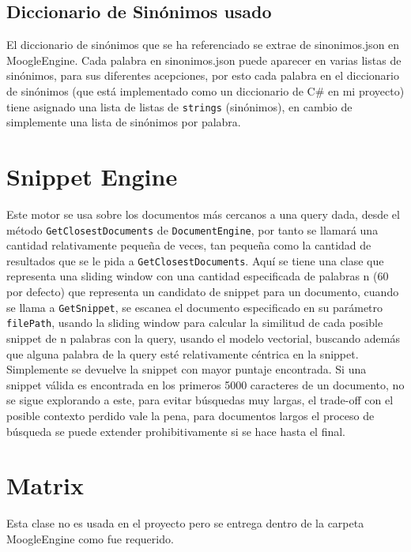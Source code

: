 \documentclass[a4paper, 12pt]{article}
\begin{document}
\subsection{Diccionario de Sinónimos usado}

El diccionario de sinónimos que se ha referenciado se extrae de
sinonimos.json en MoogleEngine. Cada palabra en sinonimos.json puede
aparecer en varias listas de sinónimos, para sus diferentes acepciones, por esto
cada palabra en el diccionario de sinónimos (que está implementado como un diccionario de C\# en mi proyecto) 
tiene asignado una lista de listas de \texttt{strings}
(sinónimos), en cambio de simplemente una lista de sinónimos por palabra.

\section{Snippet Engine}

Este motor se usa sobre los documentos más cercanos a una query dada,
desde el método \texttt{GetClosestDocuments} de \texttt{DocumentEngine}, por tanto se
llamará una cantidad relativamente pequeña de veces, tan pequeña como la
cantidad de resultados que se le pida a \texttt{GetClosestDocuments}.
Aquí se tiene una clase que representa una sliding window con una
cantidad especificada de palabras n (60 por defecto) que representa un candidato
de snippet para un documento, cuando se llama a \texttt{GetSnippet}, se escanea el
documento especificado en su parámetro \texttt{filePath}, usando la sliding window
para calcular la similitud de cada posible snippet de n palabras con la query,
usando el modelo vectorial, buscando además que alguna palabra de la query
esté relativamente céntrica en la snippet. Simplemente se devuelve la snippet
con mayor puntaje encontrada. Si una snippet válida es encontrada en los primeros
5000 caracteres de un documento, no se sigue explorando a este, para evitar
búsquedas muy largas, el trade-off con el posible contexto perdido vale la pena,
para documentos largos el proceso de búsqueda se puede extender prohibitivamente si
se hace hasta el final.

\section{Matrix}

Esta clase no es usada en el proyecto pero se entrega dentro de la carpeta
MoogleEngine como fue requerido.
\end{document}
